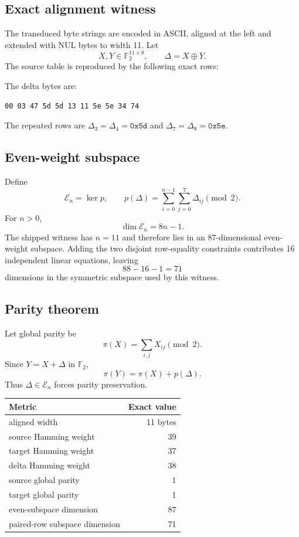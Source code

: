 \documentclass[10pt,a4paper]{article}
\newcommand{\code}[1]{\texttt{#1}}
\newcommand{\Ftwo}{\mathbb F_2}
\begin{document}
\subsection{Exact alignment witness}
The transduced byte strings are encoded in ASCII, aligned at the left and extended with NUL bytes to width 11. Let
\[
X,Y\in\Ftwo^{11\times8},
\qquad
\Delta=X\oplus Y.
\]
The source table is reproduced by the following exact rows:

\small

\normalsize

The delta bytes are:
\begin{Verbatim}[fontsize=\small]
00 03 47 5d 5d 13 11 5e 5e 34 74
\end{Verbatim}
The repeated rows are $\Delta_3=\Delta_4=\code{0x5d}$ and $\Delta_7=\Delta_8=\code{0x5e}$.

\subsection{Even-weight subspace}
Define
\[
\mathcal E_n=\ker p,
\qquad
p(\Delta)=\sum_{i=0}^{n-1}\sum_{j=0}^{7}\Delta_{ij}\pmod2.
\]
For $n>0$,
\[
\dim \mathcal E_n=8n-1.
\]
The shipped witness has $n=11$ and therefore lies in an 87-dimensional even-weight subspace. Adding the two disjoint row-equality constraints contributes 16 independent linear equations, leaving
\[
88-16-1=71
\]
dimensions in the symmetric subspace used by this witness.

\subsection{Parity theorem}
Let global parity be
\[
\pi(X)=\sum_{i,j}X_{ij}\pmod2.
\]
Since $Y=X+\Delta$ in $\Ftwo$,
\[
\pi(Y)=\pi(X)+p(\Delta).
\]
Thus $\Delta\in\mathcal E_n$ forces parity preservation.

\begin{metricbox}
\begin{tabularx}{\textwidth}{Xr}
\toprule
\textbf{Metric} & \textbf{Exact value}\\
\midrule
aligned width & 11 bytes\\
source Hamming weight & 39\\
target Hamming weight & 37\\
delta Hamming weight & 38\\
source global parity & 1\\
target global parity & 1\\
even-subspace dimension & 87\\
paired-row subspace dimension & 71\\
\bottomrule
\end{tabularx}
\end{metricbox}
\end{document}
